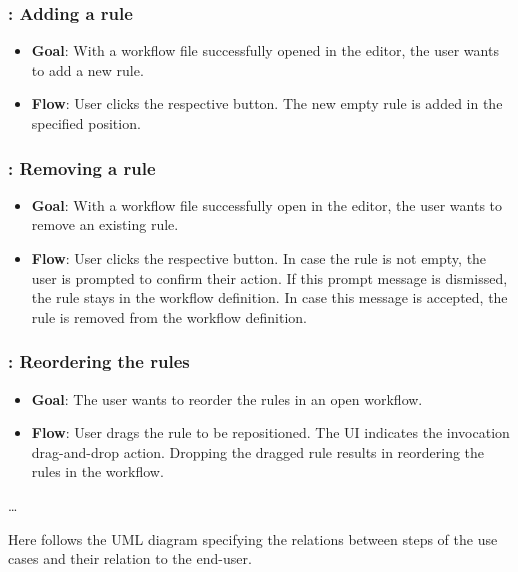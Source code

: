 \subsubsection*{\usecase: Adding a rule}
\begin{itemize}
    \item \textbf{Goal}: With a workflow file successfully opened in the editor, the user wants to add a new rule.
    \item \textbf{Flow}: User clicks the respective button. The new empty rule is added in the specified position.
\end{itemize}

\subsubsection*{\usecase: Removing a rule}
\begin{itemize}
    \item \textbf{Goal}: With a workflow file successfully open in the editor, the user wants to remove an existing rule.
    \item \textbf{Flow}: User clicks the respective button. In case the rule is not empty, the user is prompted to confirm their action.
    If this prompt message is dismissed, the rule stays in the workflow definition. In case this message is accepted, the rule is removed from the workflow definition.
\end{itemize}

\subsubsection*{\usecase: Reordering the rules}
\begin{itemize}
    \item \textbf{Goal}: The user wants to reorder the rules in an open workflow.
    \item \textbf{Flow}: User drags the rule to be repositioned. The \ac{UI} indicates the invocation drag-and-drop action.
    Dropping the dragged rule results in reordering the rules in the workflow.
\end{itemize}

\dots
\emptyline

Here follows the UML diagram specifying the relations between steps of the use cases and their relation to the end-user.

